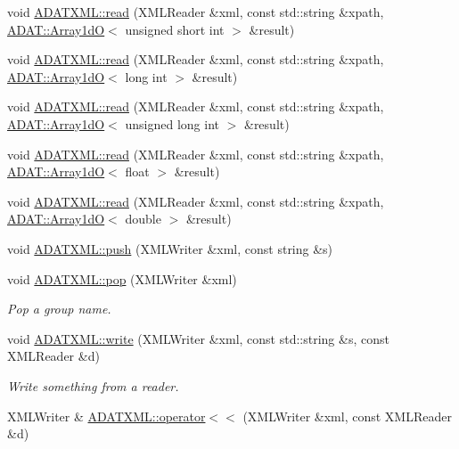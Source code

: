 \begin{DoxyCompactItemize}
\item 
void \mbox{\hyperlink{group__io_gafcc468224ec7aadb6f062319ee4a9017}{A\+D\+A\+T\+X\+M\+L\+::read}} (X\+M\+L\+Reader \&xml, const std\+::string \&xpath, \mbox{\hyperlink{classADAT_1_1Array1dO}{A\+D\+A\+T\+::\+Array1dO}}$<$ unsigned short int $>$ \&result)
\item 
void \mbox{\hyperlink{group__io_gaf73cf1373de71e822e6e7ddb48581714}{A\+D\+A\+T\+X\+M\+L\+::read}} (X\+M\+L\+Reader \&xml, const std\+::string \&xpath, \mbox{\hyperlink{classADAT_1_1Array1dO}{A\+D\+A\+T\+::\+Array1dO}}$<$ long int $>$ \&result)
\item 
void \mbox{\hyperlink{group__io_gabf73a226451fbe3963eed7cf3fbc6849}{A\+D\+A\+T\+X\+M\+L\+::read}} (X\+M\+L\+Reader \&xml, const std\+::string \&xpath, \mbox{\hyperlink{classADAT_1_1Array1dO}{A\+D\+A\+T\+::\+Array1dO}}$<$ unsigned long int $>$ \&result)
\item 
void \mbox{\hyperlink{group__io_ga2fb042288bd86fb85377268d95b5e39f}{A\+D\+A\+T\+X\+M\+L\+::read}} (X\+M\+L\+Reader \&xml, const std\+::string \&xpath, \mbox{\hyperlink{classADAT_1_1Array1dO}{A\+D\+A\+T\+::\+Array1dO}}$<$ float $>$ \&result)
\item 
void \mbox{\hyperlink{group__io_ga6356b58aa7c58aa4bb8eaed5db9f8f40}{A\+D\+A\+T\+X\+M\+L\+::read}} (X\+M\+L\+Reader \&xml, const std\+::string \&xpath, \mbox{\hyperlink{classADAT_1_1Array1dO}{A\+D\+A\+T\+::\+Array1dO}}$<$ double $>$ \&result)
\item 
void \mbox{\hyperlink{namespaceADATXML_a1e8531ea0cb1a302d918f3b427969425}{A\+D\+A\+T\+X\+M\+L\+::push}} (X\+M\+L\+Writer \&xml, const string \&s)
\item 
void \mbox{\hyperlink{group__io_gac235f191b977af85918b9a9d063ba5f4}{A\+D\+A\+T\+X\+M\+L\+::pop}} (X\+M\+L\+Writer \&xml)
\begin{DoxyCompactList}\small\item\em Pop a group name. \end{DoxyCompactList}\item 
void \mbox{\hyperlink{group__io_ga0b5b9fff1a99b7e41bb286c7c153ff78}{A\+D\+A\+T\+X\+M\+L\+::write}} (X\+M\+L\+Writer \&xml, const std\+::string \&s, const X\+M\+L\+Reader \&d)
\begin{DoxyCompactList}\small\item\em Write something from a reader. \end{DoxyCompactList}\item 
X\+M\+L\+Writer \& \mbox{\hyperlink{group__io_gaeedb0da293eebaa00dff464efbb18eab}{A\+D\+A\+T\+X\+M\+L\+::operator$<$$<$}} (X\+M\+L\+Writer \&xml, const X\+M\+L\+Reader \&d)

\end{DoxyCompactItemize}
